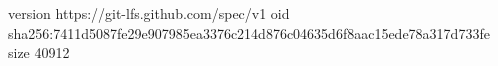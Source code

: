 version https://git-lfs.github.com/spec/v1
oid sha256:7411d5087fe29e907985ea3376c214d876c04635d6f8aac15ede78a317d733fe
size 40912
